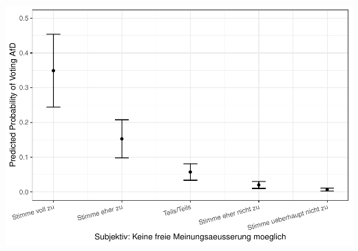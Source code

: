 \documentclass[
]{article}
\begin{document}
\includegraphics{AVCD_Final_Assignment-Edenhofer_latest_files/figure-latex/afd-cancel-culture-1.pdf}
\end{document}
